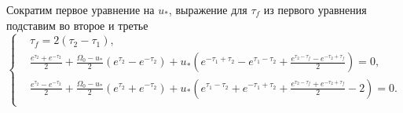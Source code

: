 \documentclass[a4paper,14pt]{article}
\theoremstyle{plain} %
\theoremstyle{definition} %
\theoremstyle{remark} %
\begin{document}
{Сократим первое уравнение на $u_*$, выражение для $\tau_f$ из первого уравнения подставим во второе и третье
\begin{equation}\label{fullconnected}
    \left\{ {\begin{aligned}
                 & \tau_f=2(\tau_2-\tau_1),                                                                                                                                                                 \\
                 & \frac{e^{\tau_2}+e^{-\tau_2}}{2}+\frac{\Omega_0-u_*}{2}(e^{\tau_2}-e^{-\tau_2})+u_*\left(e^{-\tau_1+\tau_2}-e^{\tau_1-\tau_2}+\frac{e^{\tau_2-\tau_f}-e^{-\tau_2+\tau_f}}{2}\right)=0,   \\
                 & \frac{e^{\tau_2}-e^{-\tau_2}}{2}+\frac{\Omega_0-u_*}{2}(e^{\tau_2}+e^{-\tau_2})+u_*\left(e^{\tau_1-\tau_2}+e^{-\tau_1+\tau_2}+\frac{e^{\tau_2-\tau_f}+e^{-\tau_2+\tau_f}}{2}-2\right)=0. \\
            \end{aligned}} \right.
\end{equation}

}
\end{document}
